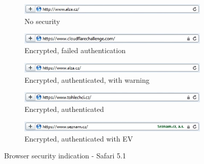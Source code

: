 \begin{figure}
  \begin{subfigure}[b]{\textwidth}
    \centering
    \includegraphics[scale=0.6]{images/browsers/s-none.png}
    \caption{No security}
  \end{subfigure}
  \begin{subfigure}[b]{\textwidth}
    \centering
    \includegraphics[scale=0.6]{images/browsers/s-untrusted.png}
    \caption{Encrypted, failed authentication}
  \end{subfigure}
  \begin{subfigure}[b]{\textwidth}
    \centering
    \includegraphics[scale=0.6]{images/browsers/s-warning.png}
    \caption{Encrypted, authenticated, with warning}
  \end{subfigure}
  \begin{subfigure}[b]{\textwidth}
    \centering
    \includegraphics[scale=0.6]{images/browsers/s-dv.png}
    \caption{Encrypted, authenticated}
  \end{subfigure}
  \begin{subfigure}[b]{\textwidth}
    \centering
    \includegraphics[scale=0.6]{images/browsers/s-ev.png}
    \caption{Encrypted, authenticated with EV}
  \end{subfigure}
  \caption{Browser security indication - Safari 5.1}
\end{figure}
